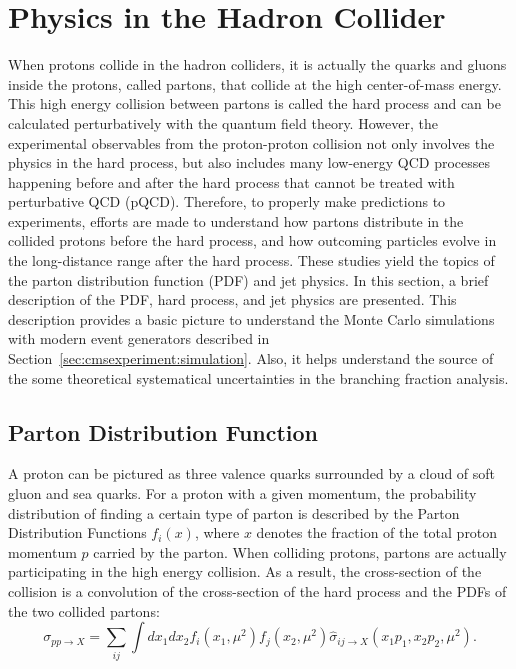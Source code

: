 

\section{Physics in the Hadron Collider}
\label{sec:relatedWorks:ppCollision} 

When protons collide in the hadron colliders, it is actually the quarks and gluons inside the protons, called partons, that collide at the high center-of-mass energy. This high energy collision between partons is called the hard process and can be calculated perturbatively with the quantum field theory. However, the experimental observables from the proton-proton collision not only involves the physics in the hard process, but also includes many low-energy QCD processes happening before and after the hard process that cannot be treated with perturbative QCD (pQCD). Therefore, to properly make predictions to experiments, efforts are made to understand how partons distribute in the collided protons before the hard process, and how outcoming particles evolve in the long-distance range after the hard process. These studies yield the topics of the parton distribution function (PDF) and jet physics. In this section, a brief description of the PDF, hard process, and jet physics are presented. This description provides a basic picture to understand the Monte Carlo simulations with modern event generators described in Section~\ref{sec:cmsexperiment:simulation}. Also, it helps understand the source of the some theoretical systematical uncertainties in the \PW branching fraction analysis.

\subsection{Parton Distribution Function}
\label{sec:relatedWorks:ppCollision:pdf} 


A proton can be pictured as three valence quarks surrounded by a cloud of soft gluon and sea quarks. For a proton with a given momentum, the probability distribution of finding a certain type of parton is described by the Parton Distribution Functions $f_i(x)$, where $x$ denotes the fraction of the total proton momentum $p$ carried by the parton. When colliding protons, partons are actually participating in the high energy collision. As a result, the cross-section of the collision is a convolution of the cross-section of the hard process and the PDFs of the two collided partons:
\begin{equation}
    \sigma_{pp\to X } = \sum_{ij}\int dx_1 dx_2 f_i(x_1, \mu^2) f_j(x_2, \mu^2) \hat{\sigma}_{ij\to X } (x_1 p_1, x_2 p_2,\mu^2) .
    \label{eqn:relatedWorks:qft:ppCollision:factorization}
\end{equation}

